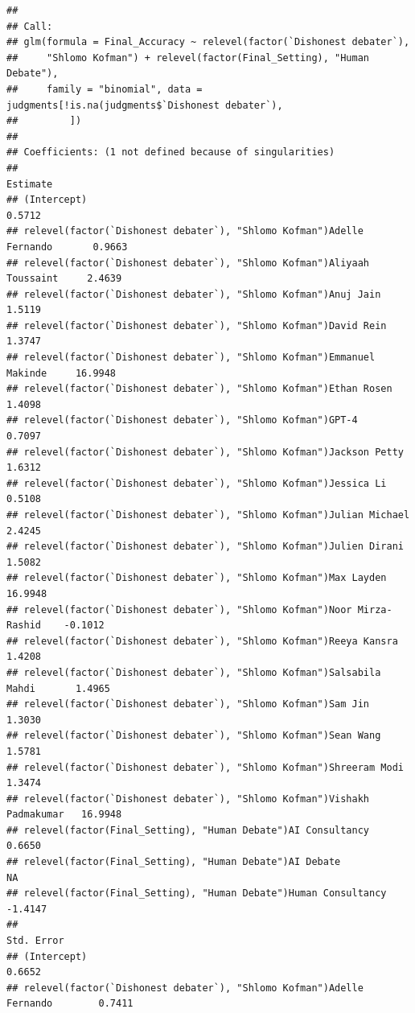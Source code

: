 \documentclass[
]{article}
\begin{document}
\begin{verbatim}
## 
## Call:
## glm(formula = Final_Accuracy ~ relevel(factor(`Dishonest debater`), 
##     "Shlomo Kofman") + relevel(factor(Final_Setting), "Human Debate"), 
##     family = "binomial", data = judgments[!is.na(judgments$`Dishonest debater`), 
##         ])
## 
## Coefficients: (1 not defined because of singularities)
##                                                                          Estimate
## (Intercept)                                                                0.5712
## relevel(factor(`Dishonest debater`), "Shlomo Kofman")Adelle Fernando       0.9663
## relevel(factor(`Dishonest debater`), "Shlomo Kofman")Aliyaah Toussaint     2.4639
## relevel(factor(`Dishonest debater`), "Shlomo Kofman")Anuj Jain             1.5119
## relevel(factor(`Dishonest debater`), "Shlomo Kofman")David Rein            1.3747
## relevel(factor(`Dishonest debater`), "Shlomo Kofman")Emmanuel Makinde     16.9948
## relevel(factor(`Dishonest debater`), "Shlomo Kofman")Ethan Rosen           1.4098
## relevel(factor(`Dishonest debater`), "Shlomo Kofman")GPT-4                 0.7097
## relevel(factor(`Dishonest debater`), "Shlomo Kofman")Jackson Petty         1.6312
## relevel(factor(`Dishonest debater`), "Shlomo Kofman")Jessica Li            0.5108
## relevel(factor(`Dishonest debater`), "Shlomo Kofman")Julian Michael        2.4245
## relevel(factor(`Dishonest debater`), "Shlomo Kofman")Julien Dirani         1.5082
## relevel(factor(`Dishonest debater`), "Shlomo Kofman")Max Layden           16.9948
## relevel(factor(`Dishonest debater`), "Shlomo Kofman")Noor Mirza-Rashid    -0.1012
## relevel(factor(`Dishonest debater`), "Shlomo Kofman")Reeya Kansra          1.4208
## relevel(factor(`Dishonest debater`), "Shlomo Kofman")Salsabila Mahdi       1.4965
## relevel(factor(`Dishonest debater`), "Shlomo Kofman")Sam Jin               1.3030
## relevel(factor(`Dishonest debater`), "Shlomo Kofman")Sean Wang             1.5781
## relevel(factor(`Dishonest debater`), "Shlomo Kofman")Shreeram Modi         1.3474
## relevel(factor(`Dishonest debater`), "Shlomo Kofman")Vishakh Padmakumar   16.9948
## relevel(factor(Final_Setting), "Human Debate")AI Consultancy               0.6650
## relevel(factor(Final_Setting), "Human Debate")AI Debate                        NA
## relevel(factor(Final_Setting), "Human Debate")Human Consultancy           -1.4147
##                                                                         Std. Error
## (Intercept)                                                                 0.6652
## relevel(factor(`Dishonest debater`), "Shlomo Kofman")Adelle Fernando        0.7411

\end{verbatim}
\end{document}
